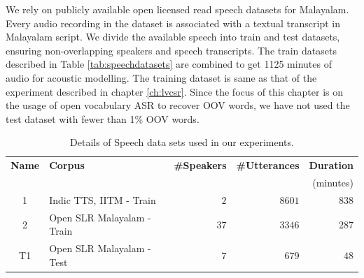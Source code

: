 We rely on publicly available open licensed read speech datasets
\cite{baby2016resources,he-etal-2020-open} for Malayalam. Every audio recording
in the dataset is associated with a textual transcript in Malayalam script. We
divide the available speech into train and test datasets, ensuring
non-overlapping speakers and speech transcripts.
 The train datasets described in Table \ref{tab:speechdatasets} are combined to
get 1125 minutes of audio for acoustic modelling. The training dataset is same as that of the experiment described in chapter \ref{ch:lvcsr}. Since the focus of this chapter is on the usage of open vocabulary ASR to recover OOV words, we have not used the test dataset with fewer than 1\% OOV words.

\begin{table}[htpb]
    \caption{Details of Speech data sets used in our experiments. }
    \label{tab:speechdatasets-subword}
    \centering
    \begin{tabular}{clrrr}
        \hline \hline
        \textbf{Name} & \textbf{Corpus}                                     & \textbf{\#Speakers} & \textbf{\#Utterances} & \textbf{Duration} \\
                      &                                                     &                     &                       & (minutes)         \\
        \hline
        1             & Indic TTS, IITM \cite{baby2016resources}- Train     & $2$                   & $8601$                  & $838$               \\
        2             & Open SLR Malayalam \cite{he-etal-2020-open} - Train & $37$                  & $3346$                  & $287$               \\
        T1            & Open SLR Malayalam \cite{he-etal-2020-open} - Test  & $7$                   & $679$                   & $48$                \\

        \hline

    \end{tabular}

\end{table}

